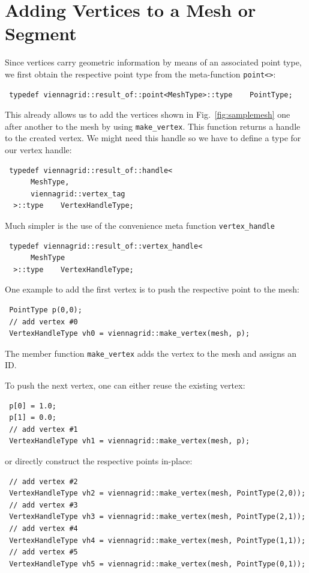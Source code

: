 \pagebreak

\section{Adding Vertices to a Mesh or Segment}
Since vertices carry geometric information by means of an associated point type, we first obtain the respective point type from the meta-function \lstinline|point<>|:
\begin{lstlisting}
 typedef viennagrid::result_of::point<MeshType>::type    PointType;
\end{lstlisting}
This already allows us to add the vertices shown in Fig.~\ref{fig:samplemesh} one after another to the mesh by using \lstinline|make_vertex|. This function returns a handle to the created vertex. We might need this handle so we have to define a type for our vertex handle:
\begin{lstlisting}
 typedef viennagrid::result_of::handle<
      MeshType,
      viennagrid::vertex_tag
  >::type    VertexHandleType;
\end{lstlisting}
Much simpler is the use of the convenience meta function \lstinline|vertex_handle|
\begin{lstlisting}
 typedef viennagrid::result_of::vertex_handle<
      MeshType
  >::type    VertexHandleType;
\end{lstlisting}
One example to add the first vertex is to push the respective point to the mesh:
\begin{lstlisting}
 PointType p(0,0);
 // add vertex #0
 VertexHandleType vh0 = viennagrid::make_vertex(mesh, p);
\end{lstlisting}
The member function \lstinline|make_vertex| adds the vertex to the mesh and assigns an ID.

To push the next vertex, one can either reuse the existing vertex:
\begin{lstlisting}
 p[0] = 1.0;
 p[1] = 0.0;
 // add vertex #1
 VertexHandleType vh1 = viennagrid::make_vertex(mesh, p);
\end{lstlisting}

\pagebreak

or directly construct the respective points in-place:
\begin{lstlisting}
 // add vertex #2
 VertexHandleType vh2 = viennagrid::make_vertex(mesh, PointType(2,0));
 // add vertex #3
 VertexHandleType vh3 = viennagrid::make_vertex(mesh, PointType(2,1));
 // add vertex #4
 VertexHandleType vh4 = viennagrid::make_vertex(mesh, PointType(1,1));
 // add vertex #5
 VertexHandleType vh5 = viennagrid::make_vertex(mesh, PointType(0,1));
\end{lstlisting}

